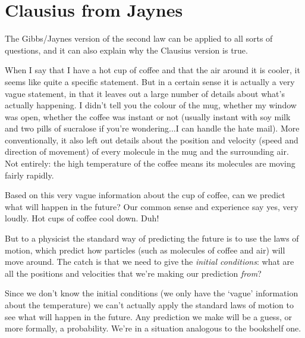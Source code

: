 \documentclass[a4paper, 12pt]{article}
\begin{document}
\section*{Clausius from Jaynes}
The Gibbs/Jaynes version of the second law can be applied to all sorts of
questions, and it can also explain why the Clausius version is true. 

When I say that I have a hot cup of coffee and that the air around it is cooler,
it seems like quite a specific statement. But in a certain sense it is actually
a very vague statement, in that it leaves out a large number of details about
what's actually happening. I didn't tell you the colour of the mug, whether
my window was open, whether the coffee was instant or not (usually instant with
soy milk and two pills of sucralose if you're wondering...I can handle the hate mail). More conventionally, it also left out details about the position and
velocity (speed and direction of movement) of every molecule in the mug and
the surrounding air. Not entirely: the high temperature of the coffee means its
molecules are moving fairly rapidly.

Based on this very vague information about the cup of coffee, can we predict
what will happen in the future? Our common sense and experience say yes, very
loudly. Hot cups of coffee cool down. Duh!

But to a physicist the standard way of predicting the future is to use
the laws of motion, which predict how particles (such as molecules of coffee
and air) will move around. The catch is that we need to give the {\it initial
conditions}: what are all the positions and velocities that we're making our
prediction {\it from}?

Since we don't know the initial conditions (we only have the `vague' information
about the temperature) we can't actually apply the standard laws of motion to
see what will happen in the future. Any prediction we make will be a
guess, or more formally, a probability. We're in a situation analogous to the
bookshelf one.
\end{document}
